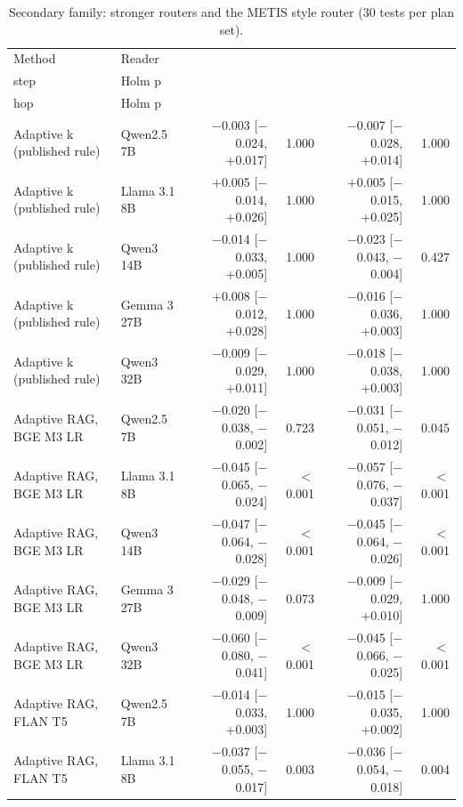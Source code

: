 \begin{table}[t]
\centering\small
\setlength{\tabcolsep}{4pt}
\caption{Secondary family: stronger routers and the METIS style router (30 tests per plan set).}
\label{tab:secondary}
\begin{tabular*}{\linewidth}{@{\extracolsep{\fill}}llrrrr}
\toprule
Method & Reader & \begin{tabular}[b]{@{}r@{}}Gain, single \\ step\end{tabular} & Holm p & \begin{tabular}[b]{@{}r@{}}Gain, with two \\ hop\end{tabular} & Holm p  \\
\midrule
Adaptive k (published rule) & Qwen2.5 7B & $-$0.003 [$-$0.024, +0.017] & 1.000 & $-$0.007 [$-$0.028, +0.014] & 1.000 \\
Adaptive k (published rule) & Llama 3.1 8B & +0.005 [$-$0.014, +0.026] & 1.000 & +0.005 [$-$0.015, +0.025] & 1.000 \\
Adaptive k (published rule) & Qwen3 14B & $-$0.014 [$-$0.033, +0.005] & 1.000 & $-$0.023 [$-$0.043, $-$0.004] & 0.427 \\
Adaptive k (published rule) & Gemma 3 27B & +0.008 [$-$0.012, +0.028] & 1.000 & $-$0.016 [$-$0.036, +0.003] & 1.000 \\
Adaptive k (published rule) & Qwen3 32B & $-$0.009 [$-$0.029, +0.011] & 1.000 & $-$0.018 [$-$0.038, +0.003] & 1.000 \\
Adaptive RAG, BGE M3 LR & Qwen2.5 7B & $-$0.020 [$-$0.038, $-$0.002] & 0.723 & $-$0.031 [$-$0.051, $-$0.012] & 0.045 \\
Adaptive RAG, BGE M3 LR & Llama 3.1 8B & $-$0.045 [$-$0.065, $-$0.024] & $<$0.001 & $-$0.057 [$-$0.076, $-$0.037] & $<$0.001 \\
Adaptive RAG, BGE M3 LR & Qwen3 14B & $-$0.047 [$-$0.064, $-$0.028] & $<$0.001 & $-$0.045 [$-$0.064, $-$0.026] & $<$0.001 \\
Adaptive RAG, BGE M3 LR & Gemma 3 27B & $-$0.029 [$-$0.048, $-$0.009] & 0.073 & $-$0.009 [$-$0.029, +0.010] & 1.000 \\
Adaptive RAG, BGE M3 LR & Qwen3 32B & $-$0.060 [$-$0.080, $-$0.041] & $<$0.001 & $-$0.045 [$-$0.066, $-$0.025] & $<$0.001 \\
Adaptive RAG, FLAN T5 & Qwen2.5 7B & $-$0.014 [$-$0.033, +0.003] & 1.000 & $-$0.015 [$-$0.035, +0.002] & 1.000 \\
Adaptive RAG, FLAN T5 & Llama 3.1 8B & $-$0.037 [$-$0.055, $-$0.017] & 0.003 & $-$0.036 [$-$0.054, $-$0.018] & 0.004 \\

\end{tabular*}
\end{table}
